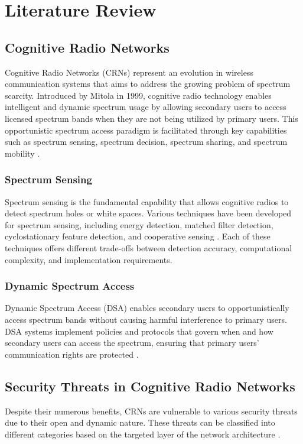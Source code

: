 \chapter{Literature Review}

\section{Cognitive Radio Networks}
Cognitive Radio Networks (CRNs) represent an evolution in wireless communication systems that aims to address the growing problem of spectrum scarcity. Introduced by Mitola \cite{mitola1999cognitive} in 1999, cognitive radio technology enables intelligent and dynamic spectrum usage by allowing secondary users to access licensed spectrum bands when they are not being utilized by primary users. This opportunistic spectrum access paradigm is facilitated through key capabilities such as spectrum sensing, spectrum decision, spectrum sharing, and spectrum mobility \cite{akyildiz2006next}.

\subsection{Spectrum Sensing}
Spectrum sensing is the fundamental capability that allows cognitive radios to detect spectrum holes or white spaces. Various techniques have been developed for spectrum sensing, including energy detection, matched filter detection, cyclostationary feature detection, and cooperative sensing \cite{yucek2009survey}. Each of these techniques offers different trade-offs between detection accuracy, computational complexity, and implementation requirements.

\subsection{Dynamic Spectrum Access}
Dynamic Spectrum Access (DSA) enables secondary users to opportunistically access spectrum bands without causing harmful interference to primary users. DSA systems implement policies and protocols that govern when and how secondary users can access the spectrum, ensuring that primary users' communication rights are protected \cite{zhao2007survey}.

\section{Security Threats in Cognitive Radio Networks}
Despite their numerous benefits, CRNs are vulnerable to various security threats due to their open and dynamic nature. These threats can be classified into different categories based on the targeted layer of the network architecture \cite{fragkiadakis2013survey}.

